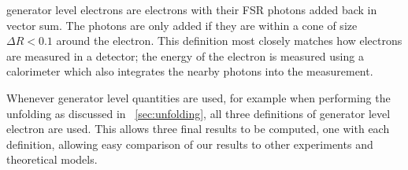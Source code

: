 \Dressed generator level electrons are \bare electrons with their FSR photons
added back in vector sum. The photons are only added if they are within a cone
of size $\Delta R < 0.1$ around the electron. This definition most closely
matches how electrons are measured in a detector; the energy of the electron is
measured using a calorimeter which also integrates the nearby photons into the
measurement.

Whenever generator level quantities are used, for example when performing the
unfolding as discussed in \CHP~\ref{sec:unfolding}, all three definitions
of generator level electron are used. This allows three final results to be
computed, one with each definition, allowing easy comparison of our results to
other experiments and theoretical models.

